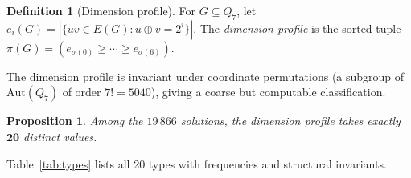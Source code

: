 \documentclass[12pt,a4paper]{article}
\newtheorem{proposition}[theorem]{Proposition}
\theoremstyle{definition}
\newtheorem{definition}[theorem]{Definition}
\begin{document}
\begin{definition}[Dimension profile]
For $G\subseteq Q_7$, let $e_i(G)=|\{uv\in E(G):u\oplus v=2^i\}|$.
The \emph{dimension profile} is the sorted tuple
$\pi(G)=(e_{\sigma(0)}\ge\cdots\ge e_{\sigma(6)})$.
\end{definition}

The dimension profile is invariant under coordinate permutations (a subgroup
of $\mathrm{Aut}(Q_7)$ of order $7!=5040$), giving a coarse but computable
classification.

\begin{proposition}\label{prop:twenty}
Among the $19\,866$ solutions, the dimension profile takes exactly
$\mathbf{20}$ distinct values.
\end{proposition}

Table~\ref{tab:types} lists all 20 types with frequencies and structural invariants.
\end{document}
